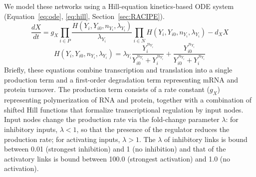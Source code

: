 \documentclass[11pt]{article}
\begin{document}
We model these networks using a Hill-equation kinetics-based ODE system (Equation~\ref{eq:ode}, \ref{eq:hill}, Section~\ref{sec:RACIPE}). 
\begin{equation}
\frac{dX}{dt} = g_X \prod_{i \in P} \frac{H(Y_i, Y_{i0}, n_{Y_i}, \lambda_{Y_i})}{\lambda_{Y_i}} \prod_{i \in N} H(Y_i, Y_{i0}, n_{Y_i}, \lambda_{Y_i}) - d_X X
\label{eq:ode}
\end{equation}
\begin{equation}
H(Y_i, Y_{i0}, n_{Y_i}, \lambda_{Y_i}) = \lambda_{Y_i} \frac{Y_i^{\,n_{Y_i}}}{Y_{i0}^{\,n_{Y_i}} + Y_i^{\,n_{Y_i}}} + \frac{Y_{i0}^{\,n_{Y_i}}}{Y_{i0}^{\,n_{Y_i}} + Y_i^{\,n_{Y_i}}}
\label{eq:hill}
\end{equation}
Briefly, these equations combine transcription and translation into a single production term and a first-order degradation term representing mRNA and protein turnover. The production term consists of a rate constant ($g_X$) representing polymerization of RNA and protein, together with a combination of shifted Hill functions that formalize transcriptional regulation by input nodes. Input nodes change the production rate via the fold-change parameter $\lambda$: for inhibitory inputs, $\lambda < 1$, so that the presence of the regulator reduces the production rate; for activating inputs, $\lambda > 1$. The $\lambda$ of inhibitory links is bound between 0.01 (strongest inhibition) and 1 (no inhibition) and that of the activatory links is bound between 100.0 (strongest activation) and 1.0 (no activation). 
\end{document}
